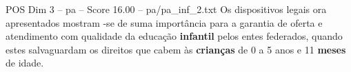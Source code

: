 \begin{textsample}{POS Dim 3 – pa – Score 16.00 – pa/pa\_inf\_2.txt}
Os dispositivos legais ora apresentados mostram -se de suma importância para a garantia de oferta e atendimento com qualidade da educação \textbf{infantil} pelos entes federados, quando estes salvaguardam os direitos que cabem às \textbf{crianças} de 0 a 5 anos e 11 \textbf{meses} de idade.

\end{textsample}
